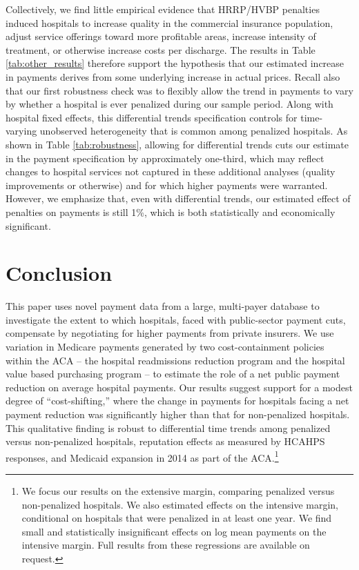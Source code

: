 \documentclass[12pt]{article}
\begin{document}
Collectively, we find little empirical evidence that HRRP/HVBP penalties induced hospitals to increase quality in the commercial insurance population, adjust service offerings toward more profitable areas, increase intensity of treatment, or otherwise increase costs per discharge. The results in Table \ref{tab:other_results} therefore support the hypothesis that our estimated increase in payments derives from some underlying increase in actual prices.  Recall also that our first robustness check was to flexibly allow the trend in payments to vary by whether a hospital is ever penalized during our sample period.   Along with hospital fixed effects, this differential trends specification controls for time-varying unobserved heterogeneity that is common among penalized hospitals.  As shown in Table \ref{tab:robustness}, allowing for differential trends cuts our estimate in the payment specification by approximately one-third, which may reflect changes to hospital services not captured in these additional analyses (quality improvements or otherwise) and for which higher payments were warranted.  However, we emphasize that, even with differential trends, our estimated effect of penalties on payments is still 1\%, which is both statistically and economically significant.

\section{Conclusion}
\label{sec:Conclusion}
This paper uses novel payment data from a large, multi-payer database to investigate the extent to which hospitals, faced with public-sector payment cuts, compensate by negotiating for higher payments from private insurers.  We use variation in Medicare payments generated by two cost-containment policies within the ACA -- the hospital readmissions reduction program and the hospital value based purchasing program -- to estimate the role of a net public payment reduction on average hospital payments.  Our results suggest support for a modest degree of ``cost-shifting,''  where the change in payments for hospitals facing a net payment reduction was significantly higher than that for non-penalized hospitals. This qualitative finding is robust to differential time trends among penalized versus non-penalized hospitals, reputation effects as measured by HCAHPS responses, and Medicaid expansion in 2014 as part of the ACA.\footnote{We focus our results on the extensive margin, comparing penalized versus non-penalized hospitals. We also estimated effects on the intensive margin, conditional on hospitals that were penalized in at least one year. We find small and statistically insignificant effects on log mean payments on the intensive margin. Full results from these regressions are available on request.}
\end{document}
